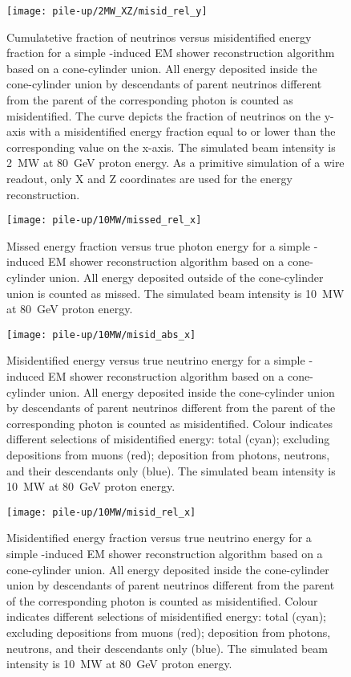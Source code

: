 \begin{figure}[htb]
	\centering
	\texttt{[image: pile-up/2MW\_XZ/misid\_rel\_y]}
	\caption{Cumulatetive fraction of neutrinos versus misidentified energy fraction for a simple \Pgpz-induced EM shower reconstruction algorithm based on a cone-cylinder union.
		All energy deposited inside the cone-cylinder union by descendants of parent neutrinos different from the parent of the corresponding \Pgpz photon is counted as misidentified.
		The curve depicts the fraction of neutrinos on the y-axis with a misidentified energy fraction equal to or lower than the corresponding value on the x-axis.
		The simulated beam intensity is \SI{2}{\mega\watt} at \SI{80}{\giga\electronvolt} proton energy.
		As a primitive simulation of a wire readout, only X and Z coordinates are used for the energy reconstruction.}
	\label{fig:dune-nd_2MW-XZ_misid-rel-y}
\end{figure}

\begin{figure}[htb]
	\centering
	\texttt{[image: pile-up/10MW/missed\_rel\_x]}
	\caption{Missed energy fraction versus true photon energy for a simple \Pgpz-induced EM shower reconstruction algorithm based on a cone-cylinder union.
		All energy deposited outside of the cone-cylinder union is counted as missed.
		The simulated beam intensity is \SI{10}{\mega\watt} at \SI{80}{\giga\electronvolt} proton energy.}
	\label{fig:dune-nd_10MW_missed-rel-x}
\end{figure}

\begin{figure}[htb]
	\centering
	\texttt{[image: pile-up/10MW/misid\_abs\_x]}
	\caption{Misidentified energy versus true neutrino energy for a simple \Pgpz-induced EM shower reconstruction algorithm based on a cone-cylinder union.
		All energy deposited inside the cone-cylinder union by descendants of parent neutrinos different from the parent of the corresponding \Pgpz photon is counted as misidentified.
		Colour indicates different selections of misidentified energy: total (cyan); excluding depositions from muons (red); deposition from photons, neutrons, and their descendants only (blue).
		The simulated beam intensity is \SI{10}{\mega\watt} at \SI{80}{\giga\electronvolt} proton energy.}
	\label{fig:dune-nd_10MW_misid-abs-x}
\end{figure}

\begin{figure}[htb]
	\centering
	\texttt{[image: pile-up/10MW/misid\_rel\_x]}
	\caption{Misidentified energy fraction versus true neutrino energy for a simple \Pgpz-induced EM shower reconstruction algorithm based on a cone-cylinder union.
		All energy deposited inside the cone-cylinder union by descendants of parent neutrinos different from the parent of the corresponding \Pgpz photon is counted as misidentified.
		Colour indicates different selections of misidentified energy: total (cyan); excluding depositions from muons (red); deposition from photons, neutrons, and their descendants only (blue).
		The simulated beam intensity is \SI{10}{\mega\watt} at \SI{80}{\giga\electronvolt} proton energy.}
	\label{fig:dune-nd_10MW_misid-rel-x}
\end{figure}

